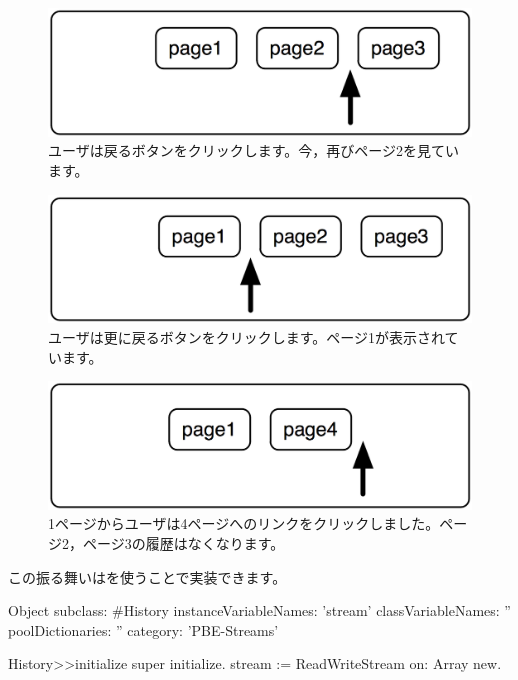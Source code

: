\documentclass[a4paper,10pt,twoside]{book}
\begin{document}
\begin{figure}[!ht]
\centerline{\includegraphics[scale=0.5]{page2_Stef}}
\caption{ユーザは戻るボタンをクリックします。今，再びページ2を見ています。}
\vspace{.2in}
\end{figure}

\begin{figure}[!ht]
\centerline{\includegraphics[scale=0.5]{page1_Stef}}
\caption{ユーザは更に戻るボタンをクリックします。ページ1が表示されています。}
\vspace{.2in}
\end{figure}

\begin{figure}[!ht]
\centerline{\includegraphics[scale=0.5]{page4Stef}}
\caption{1ページからユーザは4ページへのリンクをクリックしました。ページ2，ページ3の履歴はなくなります。}
\vspace{.2in}
\end{figure}

この振る舞いはを使うことで実装できます。

\begin{code}{}
Object subclass: #History
  instanceVariableNames: 'stream'
  classVariableNames: ''
  poolDictionaries: ''
  category: 'PBE-Streams'

History>>initialize
    super initialize.
    stream := ReadWriteStream on: Array new.
\end{code}
\end{document}
